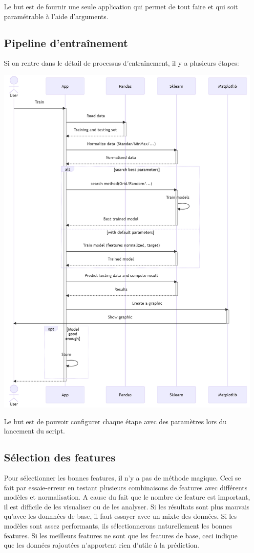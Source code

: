Le but est de fournir une seule application qui permet de tout faire et qui soit paramétrable à l'aide d'arguments.

\newpage
\subsection{Pipeline d'entraînement}
Si on rentre dans le détail de processus d'entraînement, il y a plusieurs étapes:
\begin{center}
    \includegraphics[width=140mm]{img/conception-ml-pipeline-training.png}
\end{center}

Le but est de pouvoir configurer chaque étape avec des paramètres lors du lancement du script.


\subsection{Sélection des features}
Pour sélectionner les bonnes features, il n'y a pas de méthode magique.
Ceci se fait par essaie-erreur en testant plusieurs combinaisons de features avec différents modèles et normalisation.
A cause du fait que le nombre de feature est important, il est difficile de les visualiser ou de les analyser.
Si les résultats sont plus mauvais qu'avec les donnnées de base, il faut essayer avec un mixte des données.
Si les modèles sont assez performants, ils sélectionnerons naturellement les bonnes features.
Si les meilleurs features ne sont que les features de base, ceci indique que les données rajoutées n'apportent rien d'utile à la prédiction.


